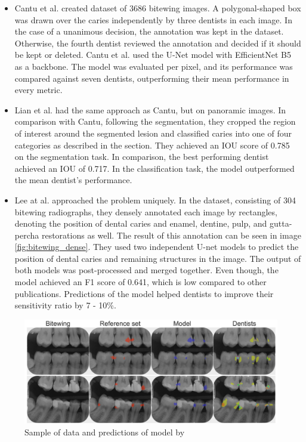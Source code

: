 \begin{itemize}
    \item{Cantu et al. \cite{Cantu2020}} created dataset of 3686 bitewing images. A polygonal-shaped box was drawn over the caries independently by three dentists in each image. In the case of a unanimous decision, the annotation was kept in the dataset. Otherwise, the fourth dentist reviewed the annotation and decided if it should be kept or deleted. Cantu et al. used the U-Net model with EfficientNet B5 as a backbone. The model was evaluated per pixel, and its performance was compared against seven dentists, outperforming their mean performance in every metric.
    \item{Lian et al. \cite{Lian2021}} had the same approach as Cantu, but on panoramic images. In comparison with Cantu, following the segmentation, they cropped the region of interest around the segmented lesion and classified caries into one of four categories as described in the section. They achieved an IOU score of 0.785 on the segmentation task. In comparison, the best performing dentist achieved an IOU of 0.717. In the classification task, the model outperformed the mean dentist's performance.
    \item {Lee at al. \cite{Lee2021}}  approached the problem uniquely. In the dataset, consisting of 304 bitewing radiographs, they densely annotated each image by rectangles, denoting the position of dental caries and enamel, dentine, pulp, and gutta-percha restorations as well. The result of this annotation can be seen in image \ref{fig:bitewing_dense}. They used two independent U-net models to predict the position of dental caries and remaining structures in the image. The output of both models was post-processed and merged together. Even though, the model achieved an F1 score of 0.641, which is low compared to other publications. Predictions of the model helped dentists to improve their sensitivity ratio by 7 - 10\%.
\end{itemize}

\begin{figure}
    \centering
    \includegraphics[width=\linewidth]{images/segmentatic_literature.png}
    \caption{Sample of data and predictions of model by }
    \label{fig:segmentation_lit}
\end{figure}

